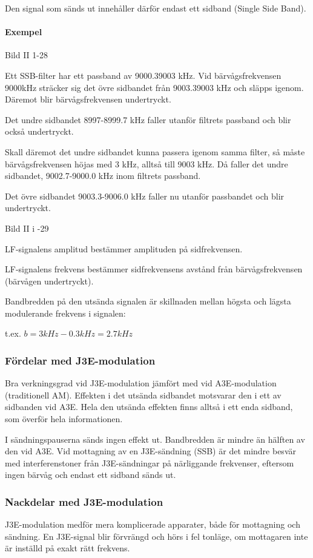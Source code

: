 \documentclass[a4paper,twoside,twocolumn,openright]{book}
\begin{document}
Den signal som sänds ut innehåller därför endast ett sidband (Single Side Band).

\paragraph{Exempel}

Bild II 1-28

Ett SSB-filter har ett passband av 9000.39003 kHz. Vid bärvågsfrekvensen 9000kHz
sträcker sig det övre sidbandet från 9003.39003 kHz och släpps igenom. Däremot blir
bärvågsfrekvensen undertryckt.

Det undre sidbandet 8997-8999.7 kHz faller utanför filtrets passband och blir också
undertryckt.

Skall däremot det undre sidbandet kunna passera igenom samma filter, så måste
bärvågsfrekvensen höjas med 3 kHz, alltså till 9003 kHz. Då faller det undre sidbandet,
9002.7-9000.0 kHz inom filtrets passband.

Det övre sidbandet 9003.3-9006.0 kHz faller nu utanför passbandet och blir undertryckt.

Bild II i -29

LF-signalens amplitud bestämmer amplituden på sidfrekvensen.

LF-signalens frekvens bestämmer sidfrekvensens avstånd från bärvågsfrekvensen (bärvågen
undertryckt).

Bandbredden på den utsända signalen är skillnaden mellan högsta och lägsta
modulerande frekvens i signalen:

t.ex. $b = 3kHz - 0.3 kHz = 2.7 kHz$

\subsubsection{Fördelar med J3E-modulation}
Bra verkningsgrad vid J3E-modulation jämfört med vid A3E-modulation (traditionell AM).
Effekten i det utsända sidbandet motsvarar den i ett av sidbanden vid A3E. Hela den
utsända effekten finns alltså i ett enda sidband, som överför hela informationen.

I sändningspauserna sänds ingen effekt ut. Bandbredden är mindre än hälften av den
vid A3E. Vid mottagning av en J3E-sändning (SSB) är det mindre besvär med interferenstoner
från J3E-sändningar på närliggande frekvenser, eftersom ingen bärvåg och endast ett
sidband sänds ut.

\subsubsection{Nackdelar med J3E-modulation}
J3E-modulation medför mera komplicerade apparater, både för mottagning och sändning.
En J3E-signal blir förvrängd och hörs i fel tonläge, om mottagaren inte är inställd på
exakt rätt frekvens.
\end{document}
